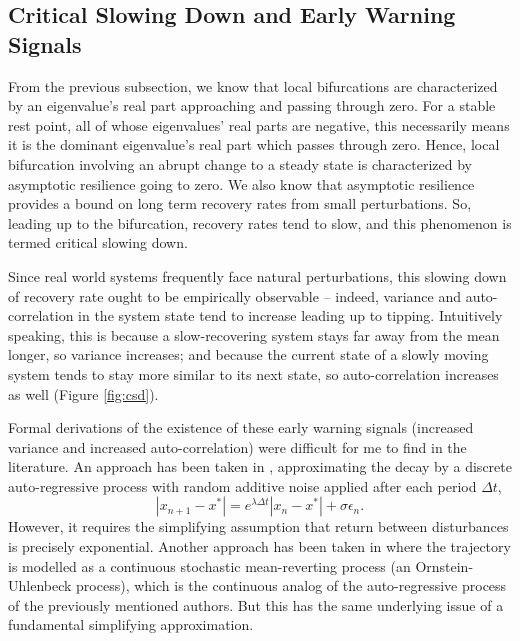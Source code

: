 



%


\subsection{Critical Slowing Down and Early Warning Signals}

From the previous subsection, we know that local bifurcations are characterized by an eigenvalue's real part approaching and passing through zero. For a stable rest point, all of whose eigenvalues' real parts are negative, this necessarily means it is the dominant eigenvalue's real part which passes through zero. Hence, local bifurcation involving an abrupt change to a steady state is characterized by asymptotic resilience going to zero. We also know that asymptotic resilience provides a bound on long term recovery rates from small perturbations. So, leading up to the bifurcation, recovery rates tend to slow, and this phenomenon is termed critical slowing down. 

Since real world systems frequently face natural perturbations, this slowing down of recovery rate ought to be empirically observable -- indeed, variance and auto-correlation in the system state tend to increase leading up to tipping. Intuitively speaking, this is because a slow-recovering system stays far away from the mean longer, so variance increases; and because the current state of a slowly moving system tends to stay more similar to its next state, so auto-correlation increases as well (Figure \ref{fig:csd}).

Formal derivations of the existence of these early warning signals (increased variance and increased auto-correlation) were difficult for me to find in the literature. 
%
An approach has been taken in \cite{schefferCriticalTransitionsNature2009}, approximating the decay by a discrete auto-regressive process with random additive noise applied after each period $\Delta t$,
$$|x_{n+1}-x^{\ast}| = e^{\lambda \Delta t}|x_n-x^{\ast}|+\sigma\epsilon_n.$$
However, it requires the simplifying assumption that return between disturbances is precisely exponential. Another approach has been taken in \cite{ritchieEarlywarningIndicatorsDynamic2016} where the trajectory is modelled as a continuous stochastic mean-reverting process (an Ornstein-Uhlenbeck process), which is the continuous analog of the auto-regressive process of the previously mentioned authors. But this has the same underlying issue of a fundamental simplifying approximation. 

